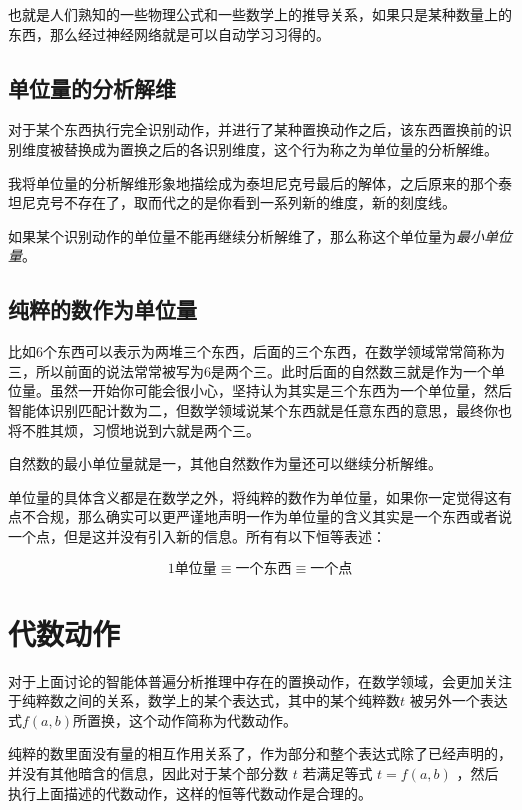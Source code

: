 \documentclass[12pt,oneside]{book}
\begin{document}
也就是人们熟知的一些物理公式和一些数学上的推导关系，如果只是某种数量上的东西，那么经过神经网络就是可以自动学习习得的。



\subsection{单位量的分析解维}
对于某个东西执行完全识别动作，并进行了某种置换动作之后，该东西置换前的识别维度被替换成为置换之后的各识别维度，这个行为称之为单位量的分析解维。

我将单位量的分析解维形象地描绘成为泰坦尼克号最后的解体，之后原来的那个泰坦尼克号不存在了，取而代之的是你看到一系列新的维度，新的刻度线。

如果某个识别动作的单位量不能再继续分析解维了，那么称这个单位量为\emph{最小单位量}。


\subsection{纯粹的数作为单位量}
比如6个东西可以表示为两堆三个东西，后面的三个东西，在数学领域常常简称为三，所以前面的说法常常被写为6是两个三。此时后面的自然数三就是作为一个单位量。虽然一开始你可能会很小心，坚持认为其实是三个东西为一个单位量，然后智能体识别匹配计数为二，但数学领域说某个东西就是任意东西的意思，最终你也将不胜其烦，习惯地说到六就是两个三。

自然数的最小单位量就是一，其他自然数作为量还可以继续分析解维。

单位量的具体含义都是在数学之外，将纯粹的数作为单位量，如果你一定觉得这有点不合规，那么确实可以更严谨地声明一作为单位量的含义其实是一个东西或者说一个点，但是这并没有引入新的信息。所有有以下恒等表述：

\begin{equation}
\label{eq:2.1}
1\text{单位量} \equiv \text{一个东西} \equiv \text{一个点}
\end{equation}


\section{代数动作}
对于上面讨论的智能体普遍分析推理中存在的置换动作，在数学领域，会更加关注于纯粹数之间的关系，数学上的某个表达式，其中的某个纯粹数$t$ 被另外一个表达式$f(a,b)$所置换，这个动作简称为代数动作。

纯粹的数里面没有量的相互作用关系了，作为部分和整个表达式除了已经声明的，并没有其他暗含的信息，因此对于某个部分数 $t$ 若满足等式 $t=f(a,b)$ ，然后执行上面描述的代数动作，这样的恒等代数动作是合理的。
\end{document}
